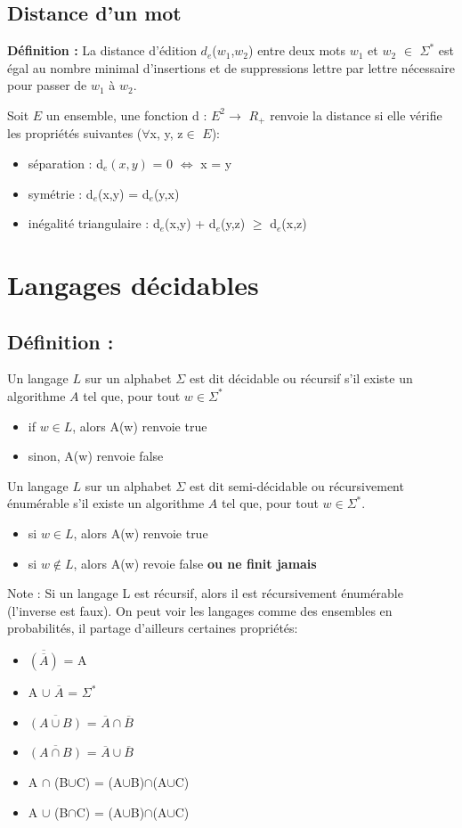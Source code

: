 \documentclass{article}
\begin{document}
\subsection{Distance d'un mot}
\textbf{Définition :}\newline
La distance d'édition $d_{e}$($w_{1}$,$w_{2}$) entre deux mots $w_{1}$ et $w_{2}$ $\in$ $\Sigma^{*}$ est égal au nombre minimal d'insertions et de suppressions lettre par lettre nécessaire pour passer de $w_{1}$ à $w_{2}$.

Soit $E$ un ensemble, une fonction d : $E^{2} \rightarrow$ $R_{+}$ renvoie la distance si elle vérifie les propriétés suivantes ($\forall$x, y, z$\in$ $E$):
\begin{itemize}
    \item séparation : d$_{e}(x,y)$ = 0 $\Longleftrightarrow$ x = y
    \item symétrie : d$_{e}$(x,y) = d$_{e}$(y,x)
    \item inégalité triangulaire : d$_{e}$(x,y) + d$_{e}$(y,z) $\geq$ d$_{e}$(x,z)
\end{itemize}
\section{Langages décidables}
\subsection{Définition :}
Un langage $L$ sur un alphabet $\Sigma$ est dit décidable ou récursif s'il existe un algorithme $A$ tel que, pour tout $w \in \Sigma^{*}$
\begin{itemize}
    \item if $w \in L$, alors A(w) renvoie true
    \item sinon, A(w) renvoie false
\end{itemize}
Un langage $L$ sur un alphabet $\Sigma$ est dit semi-décidable ou récursivement énumérable s'il existe un algorithme $A$ tel que, pour tout $w \in \Sigma^{*}$.
\begin{itemize}
    \item si $w \in L$, alors A(w) renvoie true
    \item si $w \notin L$, alors A(w) revoie false \textbf{ou ne finit jamais}
\end{itemize}
Note : Si un langage L est récursif, alors il est récursivement énumérable (l'inverse est faux).\newpage
On peut voir les langages comme des ensembles en probabilités, il partage d'ailleurs certaines propriétés:
\begin{itemize}
    \item $\overline{(\overline{A})}$ = A
    \item A $\cup$ $\overline{A}$ = $\Sigma^{*}$
    \item $\overline{(A \cup B)}$ = $\overline{A}\cap\overline{B}$
    \item $\overline{(A \cap B)}$ = $\overline{A} \cup \overline{B}$
    \item A $\cap$ (B$\cup$C) = (A$\cup$B)$\cap$(A$\cup$C)
    \item A $\cup$ (B$\cap$C) = (A$\cup$B)$\cap$(A$\cup$C)
\end{itemize}
\end{document}
